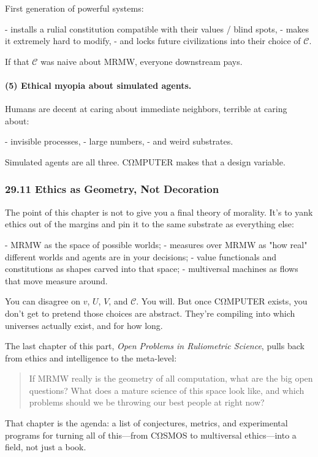 First generation of powerful systems:

- installs a rulial constitution compatible with their values / blind spots,
- makes it extremely hard to modify,
- and locks future civilizations into their choice of $\mathcal{C}$.

If that $\mathcal{C}$ was naive about MRMW, everyone downstream pays.

\paragraph{(5) Ethical myopia about simulated agents.}

Humans are decent at caring about immediate neighbors, terrible at caring about:

- invisible processes,
- large numbers,
- and weird substrates.

Simulated agents are all three.
CΩMPUTER makes that a design variable.

\subsubsection*{29.11  Ethics as Geometry, Not Decoration}

The point of this chapter is not to give you a final theory of morality.
It’s to yank ethics out of the margins and pin it to the same substrate as everything else:

- MRMW as the space of possible worlds;
- measures over MRMW as "how real" different worlds and agents are in your decisions;
- value functionals and constitutions as shapes carved into that space;
- multiversal machines as flows that move measure around.

You can disagree on $v$, $U$, $V$, and $\mathcal{C}$. You will.
But once CΩMPUTER exists, you don’t get to pretend those choices are abstract.
They’re compiling into which universes actually exist, and for how long.

\medskip

The last chapter of this part, \emph{Open Problems in Ruliometric Science}, pulls back from ethics and intelligence to the meta-level:

\begin{quote}
If MRMW really is the geometry of all computation, what are the big open questions?  
What does a mature science of this space look like, and which problems should we be throwing our best people at right now?
\end{quote}
That chapter is the agenda: a list of conjectures, metrics, and experimental programs for turning all of this—from CΩSMOS to multiversal ethics—into a field, not just a book.
